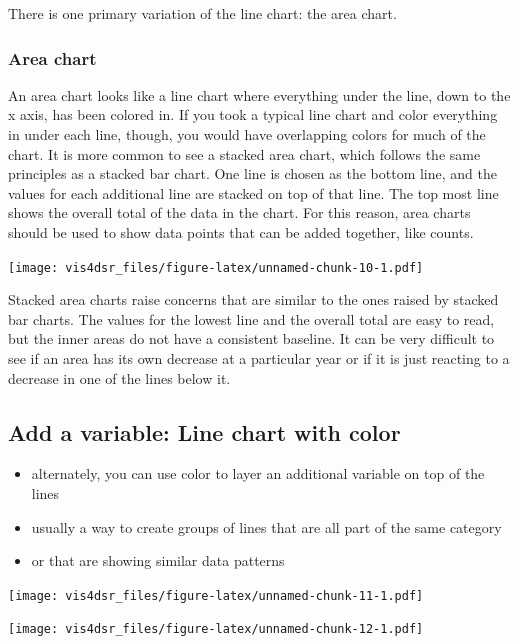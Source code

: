 \documentclass[
]{krantz}
\providecommand{\tightlist}{%
  \setlength{\itemsep}{0pt}\setlength{\parskip}{0pt}}
\begin{document}
There is one primary variation of the line chart: the area chart.

\hypertarget{area-chart}{%
\subsubsection{Area chart}\label{area-chart}}

An area chart looks like a line chart where everything under the line, down to the
x axis, has been colored in. If you took a typical line chart and color everything
in under each line, though, you would have overlapping colors for much of the chart.
It is more common to see a stacked area chart, which follows the same principles as
a stacked bar chart. One line is chosen as the bottom line, and the values for
each additional line are stacked on top of that line. The top most line shows the
overall total of the data in the chart. For this reason, area charts should be used
to show data points that can be added together, like counts.

\texttt{[image: vis4dsr\_files/figure-latex/unnamed-chunk-10-1.pdf]}

Stacked area charts raise concerns that are similar to the ones raised by stacked
bar charts. The values for the lowest line and the overall total are easy to
read, but the inner areas do not have a consistent baseline. It can be very difficult
to see if an area has its own decrease at a particular year or if it is just
reacting to a decrease in one of the lines below it.

\hypertarget{add-a-variable-line-chart-with-color}{%
\subsection{Add a variable: Line chart with color}\label{add-a-variable-line-chart-with-color}}

\begin{itemize}
\tightlist
\item
  alternately, you can use color to layer an additional variable on top of the lines
\item
  usually a way to create groups of lines that are all part of the same category
\item
  or that are showing similar data patterns
\end{itemize}

\texttt{[image: vis4dsr\_files/figure-latex/unnamed-chunk-11-1.pdf]}

\texttt{[image: vis4dsr\_files/figure-latex/unnamed-chunk-12-1.pdf]}
\end{document}
